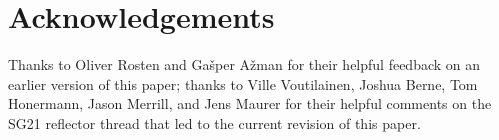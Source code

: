 

\section*{Acknowledgements}

Thanks to Oliver Rosten and Ga\v sper A\v zman for their helpful feedback on an earlier version of this paper; thanks to Ville Voutilainen, Joshua Berne, Tom Honermann, Jason Merrill, and Jens Maurer for their helpful comments on the SG21 reflector thread that led to the current revision of this paper.

\renewcommand{\bibname}{References}




